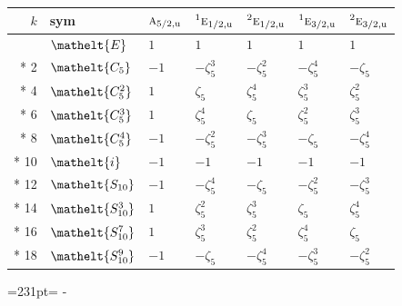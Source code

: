 \documentclass[10pt,a4paper]{article}
\newcommand{\needspace}[1]{\par\penalty-100\begingroup\dimen0=#1\relax\dimen2=\pagegoal
  \advance\dimen2-\pagetotal\ifdim\dimen0>\dimen2\relax\ifdim\dimen2>0pt\vfil\break\fi\fi
  \endgroup}
\numberwithin{equation}{section}
\newcommand{\eltfont}[1]{{\let\sigma\eltsigma\mathelt{#1}}}
\newcommand{\irr}[1]{\text{\normalfont\scshape #1}}
\newcommand{\conjpair}[1]{{}^{#1}}
\newcommand{\cls}[1]{\eltfont{#1}}
\newcommand{\ptag}[1]{\mathrm{#1}}
\newcommand{\rootunity}[1]{\zeta_{#1}}
\begin{document}
{\small\setlength{\tabcolsep}{4pt}
\begin{longtable}{@{}rllllll@{}}\toprule
$k$ & sym & $\irr{a}_{5/2,\ptag{u}}$ & $\conjpair{1}\irr{e}_{1/2,\ptag{u}}$ & $\conjpair{2}\irr{e}_{1/2,\ptag{u}}$ & $\conjpair{1}\irr{e}_{3/2,\ptag{u}}$ & $\conjpair{2}\irr{e}_{3/2,\ptag{u}}$\\\midrule\endhead
\bottomrule\endfoot\endlastfoot
0 & $\cls{E}$ & $1$ & $1$ & $1$ & $1$ & $1$\\*
2 & $\cls{C_{5}}$ & $-1$ & $-\rootunity{5}^{3}$ & $-\rootunity{5}^{2}$ & $-\rootunity{5}^{4}$ & $-\rootunity{5}$\\*
4 & $\cls{C_{5}^{2}}$ & $1$ & $\rootunity{5}$ & $\rootunity{5}^{4}$ & $\rootunity{5}^{3}$ & $\rootunity{5}^{2}$\\*
6 & $\cls{C_{5}^{3}}$ & $1$ & $\rootunity{5}^{4}$ & $\rootunity{5}$ & $\rootunity{5}^{2}$ & $\rootunity{5}^{3}$\\*
8 & $\cls{C_{5}^{4}}$ & $-1$ & $-\rootunity{5}^{2}$ & $-\rootunity{5}^{3}$ & $-\rootunity{5}$ & $-\rootunity{5}^{4}$\\*
10 & $\cls{i}$ & $-1$ & $-1$ & $-1$ & $-1$ & $-1$\\*
12 & $\cls{S_{10}}$ & $-1$ & $-\rootunity{5}^{4}$ & $-\rootunity{5}$ & $-\rootunity{5}^{2}$ & $-\rootunity{5}^{3}$\\*
14 & $\cls{S_{10}^{3}}$ & $1$ & $\rootunity{5}^{2}$ & $\rootunity{5}^{3}$ & $\rootunity{5}$ & $\rootunity{5}^{4}$\\*
16 & $\cls{S_{10}^{7}}$ & $1$ & $\rootunity{5}^{3}$ & $\rootunity{5}^{2}$ & $\rootunity{5}^{4}$ & $\rootunity{5}$\\*
18 & $\cls{S_{10}^{9}}$ & $-1$ & $-\rootunity{5}$ & $-\rootunity{5}^{4}$ & $-\rootunity{5}^{3}$ & $-\rootunity{5}^{2}$\\
\bottomrule\end{longtable}}
\needspace{231pt}
\end{document}
